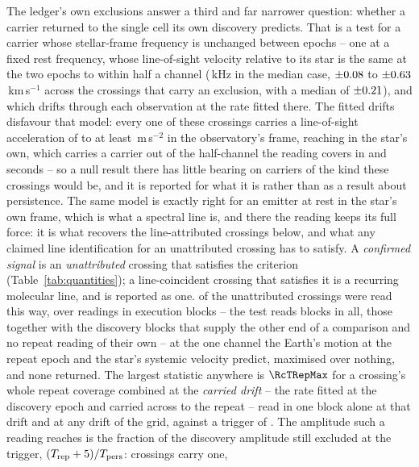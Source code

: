 The ledger's own exclusions answer a third and far narrower question: whether
a carrier returned to the single cell its own discovery predicts. That is a
test for a carrier whose stellar-frame frequency is unchanged between epochs
-- one at a fixed rest frequency, whose line-of-sight velocity relative to its
star is the same at the two epochs to within half a channel
(\RqHalfChanKHz\,kHz in the median case, $\pm0.08$ to $\pm0.63$\,km\,s$^{-1}$
across the \RcNExcl{} crossings that carry an exclusion, with a median of
$\pm0.21$), and which drifts through each observation at the rate fitted
there. The fitted drifts disfavour that model: every one of these crossings
carries a line-of-sight acceleration of \ZtALosLo{} to at least
\ZtALosHi\,m\,s$^{-2}$ in the observatory's frame, reaching \EgStarALosHi{} in
the star's own, which carries a carrier out of the half-channel the reading
covers in \ZtSxLeaveSec{} and \ZtCpLeaveSec{} seconds -- so a null result
there has little bearing on carriers of the kind these crossings would be, and
it is reported for what it is rather than as a result about persistence. The
same model is exactly right for an emitter at rest in the star's own frame,
which is what a spectral line is, and there the reading keeps its full force:
it is what recovers the line-attributed crossings below, and what any claimed
line identification for an unattributed crossing has to satisfy. A
\emph{confirmed signal} is an \emph{unattributed} crossing that satisfies the
criterion (Table~\ref{tab:quantities}); a line-coincident crossing that
satisfies it is a recurring molecular line, and is reported as one.
\RcNExclPoss{} of the \RcNTested{} unattributed crossings were read this way,
over \RcNRepeatMeas{} readings in \RcNRepeatBlock{} execution blocks -- the
test reads \ZcNRecEB{} blocks in all, those \RcNRepeatBlock{} together with
the \ZcNRecEBDisc{} discovery blocks that supply the other end of a
comparison and no repeat reading of their own -- at the
one channel the Earth's motion at the repeat epoch and the star's systemic
velocity predict, maximised over nothing, and none returned. The largest
statistic anywhere is $\RcTRepMax$ for a crossing's whole repeat coverage
combined at the \emph{carried drift} -- the rate fitted at the discovery epoch
and carried across to the repeat -- \RcTMatched{} read in one block alone at
that drift and \RcTMax{} at any drift of the grid, against a trigger of
\StageNullTrig. The amplitude such a reading reaches is the fraction of the
discovery amplitude still excluded at the trigger,
$(T_{\rm rep}+5)/T_{\rm pers}$: \RcNExcl{} crossings carry one,
